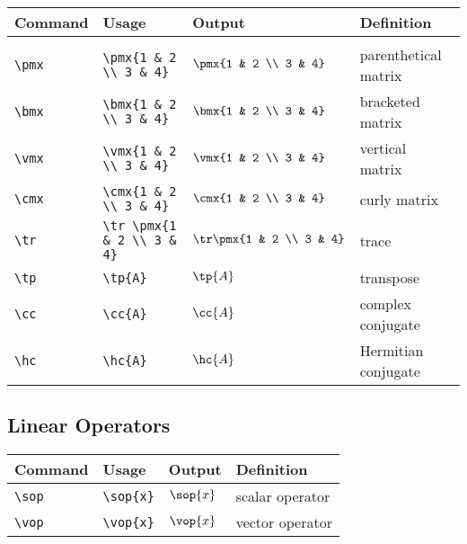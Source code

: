 \documentclass[11pt]{article}
\begin{document}
\begin{tabular}{llll}
    Command     & Usage                           & Output                     & Definition           \\
    \hline                                                                                            \\ [-3ex]
    \verb|\pmx| & \verb|\pmx{1 & 2 \\ 3 & 4}|     & $\pmx{1 & 2 \\ 3 & 4}$     & parenthetical matrix \\ [3ex]
    \verb|\bmx| & \verb|\bmx{1 & 2 \\ 3 & 4}|     & $\bmx{1 & 2 \\ 3 & 4}$     & bracketed matrix     \\ [3ex]
    \verb|\vmx| & \verb|\vmx{1 & 2 \\ 3 & 4}|     & $\vmx{1 & 2 \\ 3 & 4}$     & vertical matrix      \\ [3ex]
    \verb|\cmx| & \verb|\cmx{1 & 2 \\ 3 & 4}|     & $\cmx{1 & 2 \\ 3 & 4}$     & curly matrix         \\ [3ex]
    \verb|\tr|  & \verb|\tr \pmx{1 & 2 \\ 3 & 4}| & $\tr \pmx{1 & 2 \\ 3 & 4}$ & trace                \\ [3ex]
    \verb|\tp|  & \verb|\tp{A}|                   & $\tp{A}$                   & transpose            \\
    \verb|\cc|  & \verb|\cc{A}|                   & $\cc{A}$                   & complex conjugate    \\
    \verb|\hc|  & \verb|\hc{A}|                   & $\hc{A}$                   & Hermitian conjugate  \\
\end{tabular}

\subsection{Linear Operators}

\begin{tabular}{llll}
    Command     & Usage          & Output    & Definition      \\
    \hline
    \verb|\sop| & \verb|\sop{x}| & $\sop{x}$ & scalar operator \\
    \verb|\vop| & \verb|\vop{x}| & $\vop{x}$ & vector operator \\
\end{tabular}
\end{document}
